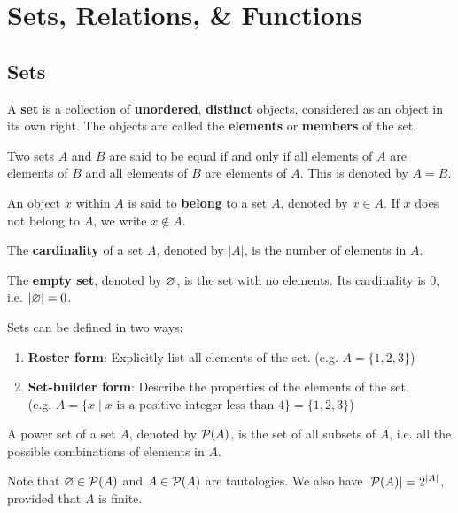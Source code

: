 \section{Sets, Relations, \& Functions}

\subsection{Sets}

\begin{definition}[Set]
    A \textbf{set} is a collection of \textbf{unordered}, \textbf{distinct} objects,
    considered as an object in its own right.
    The objects are called the \textbf{elements} or \textbf{members} of the set.

    Two sets $A$ and $B$ are said to be equal if and only if all elements of $A$ are
    elements of $B$ and all elements of $B$ are elements of $A$.
    This is denoted by $A = B$.
\end{definition}

\begin{definition}
    An object $x$ within $A$ is said to \textbf{belong} to a set $A$, denoted
    by $x \in A$. If $x$ does not belong to $A$, we write $x \notin A$.
\end{definition}

\begin{definition}[Cardinality]
    The \textbf{cardinality} of a set $A$, denoted by $|A|$, is the number of
    elements in $A$.
\end{definition}

\begin{definition}
    The \textbf{empty set}, denoted by $\varnothing$, is the set with no elements.
    Its cardinality is $0$, i.e. $|\varnothing| = 0$.
\end{definition}

\begin{remark}
    Sets can be defined in two ways:
    \begin{enumerate}
        \item \textbf{Roster form}: Explicitly list all elements of the set.
        (e.g. $A = \{1, 2, 3\}$)
        \item \textbf{Set-builder form}: Describe the properties of the elements
        of the set.\\
        (e.g. $A = \{x \mid x \text{ is a positive integer less than } 4\}
        = \{1, 2, 3\}$)
    \end{enumerate}
\end{remark}

\begin{definition}
    A power set of a set $A$, denoted by $\mathcal{P}(A)$, is the set of all subsets of $A$,
    i.e. all the possible combinations of elements in $A$.

    Note that $\varnothing \in \mathcal{P}(A)$ and $A \in \mathcal{P}(A)$ are tautologies.
    We also have $|\mathcal{P}(A)| = 2^{|A|}$, provided that $A$ is finite.
\end{definition}